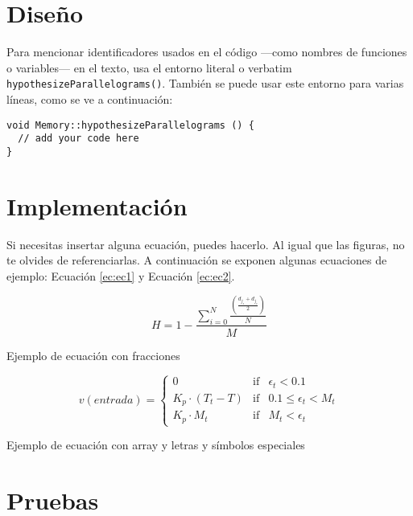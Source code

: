 \section{Diseño}

Para mencionar identificadores usados en el código ---como nombres de funciones o variables--- en el texto, usa el entorno literal o verbatim \verb|hypothesizeParallelograms()|. También se puede usar este entorno para varias líneas, como se ve a continuación:

\begin{verbatim}
void Memory::hypothesizeParallelograms () {
  // add your code here
}
\end{verbatim}

\section{Implementación}

Si necesitas insertar alguna ecuación, puedes hacerlo. Al igual que las figuras, no te olvides de referenciarlas. A continuación se exponen algunas ecuaciones de ejemplo: Ecuación \ref{ec:ec1} y Ecuación \ref{ec:ec2}.

\begin{myequation}[h]
\begin{equation}
H = 1 - \frac{\sum_{i=0}^{N}\frac{(\frac{d_{j_s} + d_{j_e}}{2})}{N}}{M}
\nonumber
\label{ec:ec1}
\end{equation}
\caption[Ejemplo de ecuación con fracciones]{Ejemplo de ecuación con fracciones}
\end{myequation} 

\begin{myequation}[h]
\begin{equation}
v(entrada)= \left\{
	\begin{array}{lcc}
		0 & \mbox{if} & \epsilon_t < 0.1\\
		K_p\cdot{(T_{t}-T)} & \mbox{if}& 0.1 \leq \epsilon_t < M_t\\
		K_p \cdot M_t & \mbox{if}& M_t < \epsilon_t
	\end{array}
\right.
\label{ec:ec2}
\end{equation}
\caption[Ejemplo de ecuación con array y letras y símbolos especiales]{Ejemplo de ecuación con array y letras y símbolos especiales}
\end{myequation}

\section{Pruebas}

